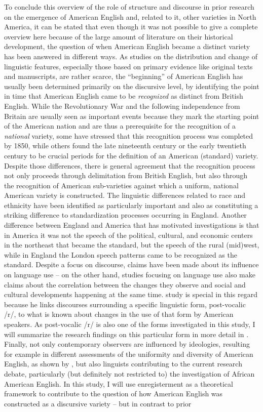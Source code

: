 To conclude this overview of the role of structure and discourse in prior research on the emergence of American English and, related to it, other varieties in North America, it can be stated that even though it was not possible to give a complete overview here because of the large amount of literature on their historical development, the question of when American English became a distinct variety has been answered in different ways. As studies on the distribution and change of linguistic features, especially those based on primary evidence like original texts and manuscripts, are rather scarce, the “beginning” of American English has usually been determined primarily on the discursive level, by identifying the point in time that American English came to be \emph{recognized} as distinct from British English. While the Revolutionary War and the following independence from Britain are usually seen as important events because they mark the starting point of the American nation and are thus a prerequisite for the recognition of a \emph{national} variety, some have stressed that this recognition process was completed by 1850, while others found the late nineteenth century or the early twentieth century to be crucial periods for the definition of an American (standard) variety. Despite those differences, there is general agreement that the recognition process not only proceeds through delimitation from British English, but also through the recognition of American sub-varieties against which a uniform, national American variety is constructed. The linguistic differences related to race and ethnicity have been identified as particularly important and also as constituting a striking difference to standardization processes occurring in England. Another difference between England and America that has motivated investigations is that in America it was not the speech of the political, cultural, and economic centers in the northeast that became the standard, but the speech of the rural (mid)west, while in England the London speech patterns came to be recognized as the standard. Despite a focus on discourse, claims have been made about its influence on language use – on the other hand, studies focusing on language use also make claims about the correlation between the changes they observe and social and cultural developments happening at the same time.  study is special in this regard because he links discourses surrounding a specific linguistic form, post-vocalic /r/, to what is known about changes in the use of that form by American speakers. As post-vocalic /r/ is also one of the forms investigated in this study, I will summarize the research findings on this particular form in more detail in . Finally, not only contemporary observers are influenced by ideologies, resulting for example in different assessments of the uniformity and diversity of American English, as shown by \citet{Cooley1992}, but also linguists contributing to the current research debate, particularly (but definitely not restricted to) the investigation of African American English. In this study, I will use enregisterment as a theoretical framework to contribute to the question of how American English was constructed as a discursive variety – but in contrast to prior 